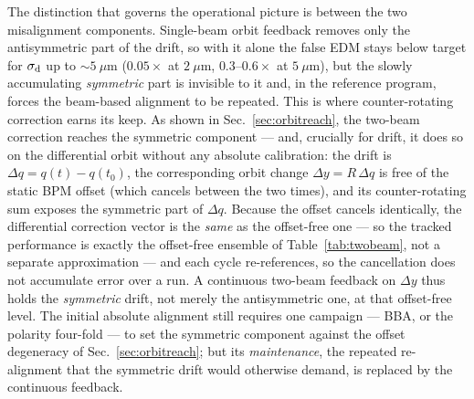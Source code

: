 \documentclass[aps,prab,reprint,superscriptaddress,nofootinbib]{revtex4-2}
\begin{document}
The distinction that governs the operational picture is between the two
misalignment components.  Single-beam orbit feedback removes only the
antisymmetric part of the drift, so with it alone the false EDM stays below
target for $\sigma_{\rm d}$ up to $\sim\!5~\mu$m ($0.05\times$ at $2~\mu$m,
$0.3$--$0.6\times$ at $5~\mu$m), but the slowly accumulating \emph{symmetric}
part is invisible to it and, in the reference program, forces the beam-based
alignment to be repeated.  This is where counter-rotating correction earns its
keep.  As shown in Sec.~\ref{sec:orbitreach}, the two-beam correction reaches
the symmetric component --- and, crucially for drift, it does so on the
differential orbit without any absolute calibration: the drift is
$\Delta q = q(t)-q(t_0)$, the corresponding orbit change
$\Delta y = R\,\Delta q$ is free of the static BPM offset (which cancels between
the two times), and its counter-rotating sum exposes the symmetric part of
$\Delta q$.  Because the offset cancels identically, the differential correction
vector is the \emph{same} as the offset-free one --- so the tracked performance
is exactly the offset-free ensemble of Table~\ref{tab:twobeam}, not a separate
approximation --- and each cycle re-references, so the cancellation does not
accumulate error over a run.  A continuous two-beam feedback on $\Delta y$ thus
holds the \emph{symmetric} drift, not merely the antisymmetric one, at that
offset-free level.  The initial absolute alignment still requires
one campaign --- BBA, or the polarity four-fold --- to set the symmetric
component against the offset degeneracy of Sec.~\ref{sec:orbitreach}; but its
\emph{maintenance}, the repeated re-alignment that the symmetric drift would
otherwise demand, is replaced by the continuous feedback.
\end{document}
